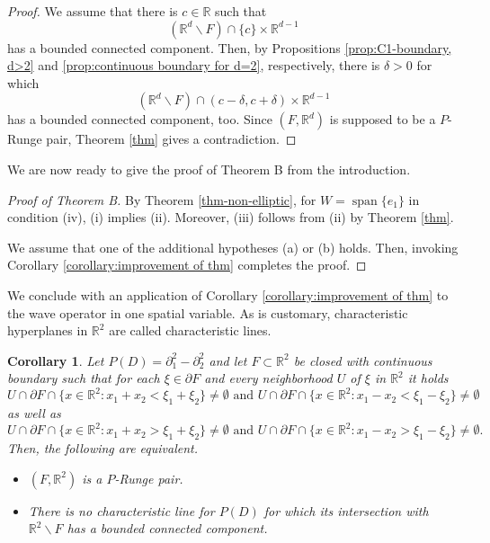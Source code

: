 \documentclass[10pt,leqno]{amsart}
\newtheorem{corollary}[prop]{Corollary}
\theoremstyle{definition}
\newcommand{\R}{\mathbb R}
\begin{document}
\begin{proof}
	We assume that there is $c\in\R$ such that
	$$(\R^d\backslash F)\cap\{c\}\times\R^{d-1}$$
	has a bounded connected component. Then, by Propositions \ref{prop:C1-boundary, d>2} and \ref{prop:continuous boundary for d=2}, respectively, there is $\delta>0$ for which
	$$(\R^d\backslash F)\cap(c-\delta,c+\delta)\times\R^{d-1}$$
	has a bounded connected component, too. Since $(F, \R^d)$ is supposed to be a $P$-Runge pair, Theorem \ref{thm} gives a contradiction.
\end{proof}

We are now ready to give the proof of Theorem B from the introduction.

\begin{proof}[Proof of Theorem B]
	By Theorem \ref{thm-non-elliptic}, for $W=\operatorname{span}\{e_1\}$ in condition (iv), (i) implies (ii). Moreover, (iii) follows from (ii) by Theorem \ref{thm}.
	
	We assume that one of the additional hypotheses (a) or (b) holds. Then, invoking Corollary \ref{corollary:improvement of thm} completes the proof.
\end{proof}

We conclude with an application of Corollary \ref{corollary:improvement of thm} to the wave operator in one spatial variable. As is customary, characteristic hyperplanes in $\R^2$ are called characteristic lines.

\begin{corollary}\label{cor:global Runge for wave operator}
	Let $P(D)=\partial_1^2-\partial_2^2$ and let $F\subset\R^2$ be closed with continuous boundary such that for each $\xi\in\partial F$ and every neighborhood $U$ of $\xi$ in $\R^2$ it holds
	$$U\cap\partial F\cap\{x\in \R^2:x_1+x_2<\xi_1+\xi_2\}\neq \emptyset\text{ and }U\cap\partial F\cap\{x\in \R^2:x_1-x_2<\xi_1-\xi_2\}\neq \emptyset$$
	as well as
	$$U\cap\partial F\cap\{x\in \R^2:x_1+x_2>\xi_1+\xi_2\}\neq \emptyset\text{ and }U\cap\partial F\cap\{x\in \R^2:x_1-x_2>\xi_1-\xi_2\}\neq \emptyset.$$
	Then, the following are equivalent.
	\begin{itemize}
		\item[(i)] $(F,\R^2)$ is a $P$-Runge pair.
		\item[(ii)] There is no characteristic line for $P(D)$ for which its intersection with $\R^2\backslash F$ has a bounded connected component.
	\end{itemize}
\end{corollary}
\end{document}
